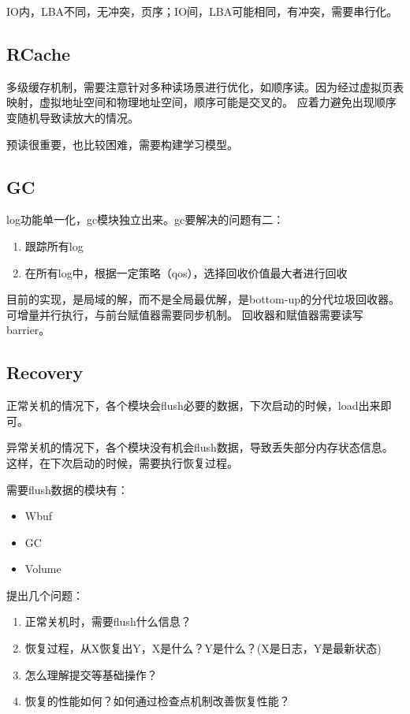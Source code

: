 \documentclass[UTF8]{ctexart}
\begin{document}
IO内，LBA不同，无冲突，页序；IO间，LBA可能相同，有冲突，需要串行化。

\subsection{RCache}

多级缓存机制，需要注意针对多种读场景进行优化，如顺序读。因为经过虚拟页表映射，虚拟地址空间和物理地址空间，顺序可能是交叉的。
应着力避免出现顺序变随机导致读放大的情况。

预读很重要，也比较困难，需要构建学习模型。

\subsection{GC}

log功能单一化，gc模块独立出来。gc要解决的问题有二：
\begin{enumerate}
    \item 跟踪所有log
    \item 在所有log中，根据一定策略（qos），选择回收价值最大者进行回收
\end{enumerate}

目前的实现，是局域的解，而不是全局最优解，是bottom-up的分代垃圾回收器。可增量并行执行，与前台赋值器需要同步机制。
回收器和赋值器需要读写barrier。

\subsection{Recovery}

正常关机的情况下，各个模块会flush必要的数据，下次启动的时候，load出来即可。

异常关机的情况下，各个模块没有机会flush数据，导致丢失部分内存状态信息。
这样，在下次启动的时候，需要执行恢复过程。

需要flush数据的模块有：
\begin{itemize}
    \item Wbuf
    \item GC
    \item Volume
\end{itemize}

提出几个问题：
\begin{tcolorbox}
\begin{enumerate}
    \item 正常关机时，需要flush什么信息？
    \item 恢复过程，从X恢复出Y，X是什么？Y是什么？(X是日志，Y是最新状态)
    \item 怎么理解提交等基础操作？
    \item 恢复的性能如何？如何通过检查点机制改善恢复性能？
\end{enumerate}
\end{tcolorbox}
\end{document}
